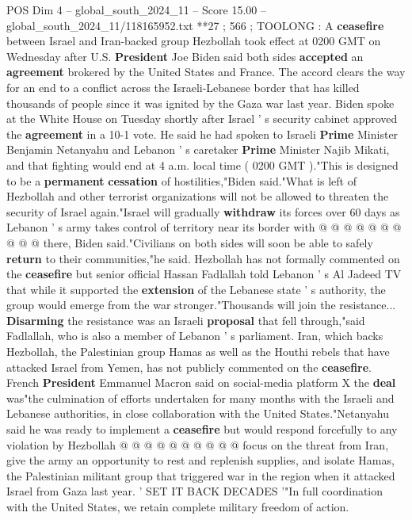 \begin{textsample}{POS Dim 4 – global\_south\_2024\_11 – Score 15.00 – global\_south\_2024\_11/118165952.txt}  \label{ex:f4_pos_289}
**27 ; 566 ; TOOLONG : A \textbf{ceasefire} between Israel and Iran-backed group Hezbollah took effect at 0200 GMT on Wednesday after U.S. \textbf{President} Joe Biden said both sides \textbf{accepted} an \textbf{agreement} brokered by the United States and France.
The accord clears the way for an end to a conflict across the Israeli-Lebanese border that has killed thousands of people since it was ignited by the Gaza war last year.
Biden spoke at the White House on Tuesday shortly after Israel ' s security cabinet approved the \textbf{agreement} in a 10-1 vote.
He said he had spoken to Israeli \textbf{Prime} Minister Benjamin Netanyahu and Lebanon ' s caretaker \textbf{Prime} Minister Najib Mikati, and that fighting would end at 4 a.m. local time ( 0200 GMT )."This is designed to be a \textbf{permanent} \textbf{cessation} of hostilities,"Biden said."What is left of Hezbollah and other terrorist organizations will not be allowed to threaten the security of Israel again."Israel will gradually \textbf{withdraw} its forces over 60 days as Lebanon ' s army takes control of territory near its border with @ @ @ @ @ @ @ @ @ @ there, Biden said."Civilians on both sides will soon be able to safely \textbf{return} to their communities,"he said.
Hezbollah has not formally commented on the \textbf{ceasefire} but senior official Hassan Fadlallah told Lebanon ' s Al Jadeed TV that while it supported the \textbf{extension} of the Lebanese state ' s authority, the group would emerge from the war stronger."Thousands will join the resistance... \textbf{Disarming} the resistance was an Israeli \textbf{proposal} that fell through,"said Fadlallah, who is also a member of Lebanon ' s parliament.
Iran, which backs Hezbollah, the Palestinian group Hamas as well as the Houthi rebels that have attacked Israel from Yemen, has not publicly commented on the \textbf{ceasefire}.
French \textbf{President} Emmanuel Macron said on social-media platform X the \textbf{deal} was"the culmination of efforts undertaken for many months with the Israeli and Lebanese authorities, in close collaboration with the United States."Netanyahu said he was ready to implement a \textbf{ceasefire} but would respond forcefully to any violation by Hezbollah @ @ @ @ @ @ @ @ @ @ focus on the threat from Iran, give the army an opportunity to rest and replenish supplies, and isolate Hamas, the Palestinian militant group that triggered war in the region when it attacked Israel from Gaza last year. ' SET IT BACK DECADES '"In full coordination with the United States, we retain complete military freedom of action.

\end{textsample}
